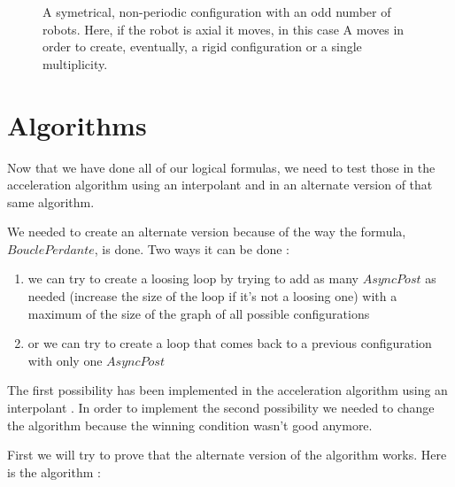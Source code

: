\documentclass{article}
\begin{document}
\begin{figure}[!h]
    \centering
    \def\svgscale{0.3}
    
    \caption{A symetrical, non-periodic configuration with an odd number of robots. Here, if the robot is axial it moves, in this case A moves in order to create, eventually, a rigid configuration or a single multiplicity.}
    \label{dessinOdd}
\end{figure}

\section{Algorithms}

Now that we have done all of our logical formulas, we need to test those in the acceleration algorithm using an interpolant \cite{algo} and in an alternate version of that same algorithm.

We needed to create an alternate version because of the way the formula, $BouclePerdante$, is done. Two ways it can be done :
\begin{enumerate}
    \item we can try to create a loosing loop by trying to add as many $AsyncPost$ as needed (increase the size of the loop if it's not a loosing one) with a maximum of the size of the graph of all possible configurations
    \item or we can try to create a loop that comes back to a previous configuration with only one $AsyncPost$
\end{enumerate}

The first possibility has been implemented in the acceleration algorithm using an interpolant \cite{algo}. In order to implement the second possibility we needed to change the algorithm because the winning condition wasn't good anymore.

First we will try to prove that the alternate version of the algorithm works.
Here is the algorithm :
\end{document}
